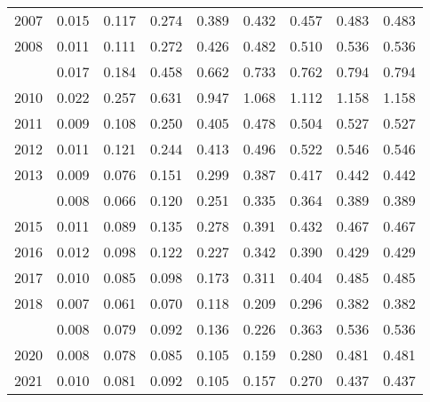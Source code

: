 \documentclass[
]{article}
\begin{document}
\begin{longtable}[t]{lrrrrrrrr}
2007 & 0.015 & 0.117 & 0.274 & 0.389 & 0.432 & 0.457 & 0.483 & 0.483\\
2008 & 0.011 & 0.111 & 0.272 & 0.426 & 0.482 & 0.510 & 0.536 & 0.536\\
\addlinespace
2009 & 0.017 & 0.184 & 0.458 & 0.662 & 0.733 & 0.762 & 0.794 & 0.794\\
2010 & 0.022 & 0.257 & 0.631 & 0.947 & 1.068 & 1.112 & 1.158 & 1.158\\
2011 & 0.009 & 0.108 & 0.250 & 0.405 & 0.478 & 0.504 & 0.527 & 0.527\\
2012 & 0.011 & 0.121 & 0.244 & 0.413 & 0.496 & 0.522 & 0.546 & 0.546\\
2013 & 0.009 & 0.076 & 0.151 & 0.299 & 0.387 & 0.417 & 0.442 & 0.442\\
\addlinespace
2014 & 0.008 & 0.066 & 0.120 & 0.251 & 0.335 & 0.364 & 0.389 & 0.389\\
2015 & 0.011 & 0.089 & 0.135 & 0.278 & 0.391 & 0.432 & 0.467 & 0.467\\
2016 & 0.012 & 0.098 & 0.122 & 0.227 & 0.342 & 0.390 & 0.429 & 0.429\\
2017 & 0.010 & 0.085 & 0.098 & 0.173 & 0.311 & 0.404 & 0.485 & 0.485\\
2018 & 0.007 & 0.061 & 0.070 & 0.118 & 0.209 & 0.296 & 0.382 & 0.382\\
\addlinespace
2019 & 0.008 & 0.079 & 0.092 & 0.136 & 0.226 & 0.363 & 0.536 & 0.536\\
2020 & 0.008 & 0.078 & 0.085 & 0.105 & 0.159 & 0.280 & 0.481 & 0.481\\
2021 & 0.010 & 0.081 & 0.092 & 0.105 & 0.157 & 0.270 & 0.437 & 0.437\\*
\end{longtable}
\end{document}
